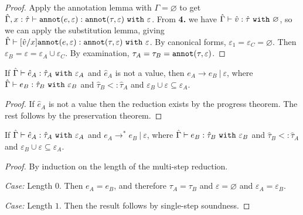 \begin{appendix}
\begin{proof}
Apply the annotation lemma with $\Gamma = \varnothing$ to get $\hat \Gamma, x: \hat \tau \vdash \mathtt{annot}(e, \varepsilon): \mathtt{annot}(\tau, \varepsilon)~\mathtt{with}~ \varepsilon$. From \textbf{4.} we have $\hat \Gamma \vdash \hat v: \hat \tau~\mathtt{with}~ \varnothing$, so we can apply the substitution lemma, giving $\hat \Gamma \vdash [\hat v/x]\mathtt{annot}(e, \varepsilon): \mathtt{annot}(\tau, \varepsilon)~\mathtt{with}~ \varepsilon$. By canonical forms, $\varepsilon_1 = \varepsilon_C = \varnothing$. Then $\varepsilon_B = \varepsilon = \varepsilon_A \cup \varepsilon_C$. By examination, $\tau_A = \tau_B = \mathtt{annot}(\tau, \varepsilon)$.

\end{proof}

\hrulefill

\begin{theorem}[Soundness]
If $\hat \Gamma \vdash \hat e_A: \hat \tau_A~\mathtt{with}~ \varepsilon_A$ and $\hat e_A$ is not a value, then $e_A \longrightarrow e_B~|~\varepsilon$, where $\hat \Gamma \vdash e_B: \hat \tau_B~\mathtt{with}~ \varepsilon_B$ and $\hat \tau_B <: \hat \tau_A$ and $\varepsilon_B \cup \varepsilon \subseteq \varepsilon_A$.
\end{theorem}
\begin{proof}
If $\hat e_A$ is not a value then the reduction exists by the progress theorem. The rest follows by the preservation theorem.
\end{proof}

\hrulefill

\begin{theorem}
If $\hat \Gamma \vdash \hat e_A: \hat \tau_A~\mathtt{with}~ \varepsilon_A$ and $e_A \longrightarrow^{*} e_B~|~\varepsilon$, where $\hat \Gamma \vdash e_B: \hat \tau_B~\mathtt{with}~ \varepsilon_B$ and $\hat \tau_B <: \hat \tau_A$ and $\varepsilon_B \cup \varepsilon \subseteq \varepsilon_A$.
\end{theorem}

\begin{proof} By induction on the length of the multi-step reduction.

\textit{Case:} Length $0$. Then $e_A = e_B$, and therefore $\tau_A = \tau_B$ and $\varepsilon = \varnothing$ and $\varepsilon_A = \varepsilon_B$.

\textit{Case:} Length $1$. Then the result follows by single-step soundness.


\end{proof}
\end{appendix}
